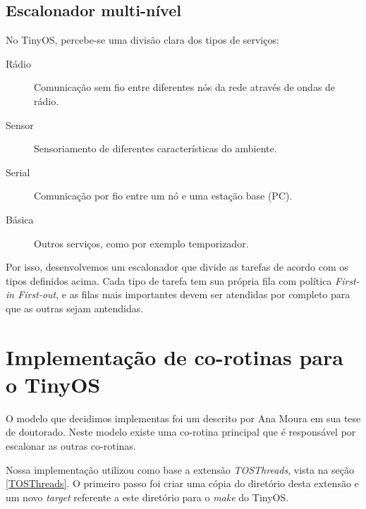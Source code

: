 \documentclass[a4paper, 10pt]{article}
\begin{document}
\subsection{Escalonador multi-nível}
No TinyOS, percebe-se uma divisão clara dos tipos de serviços: 
\begin{description}
    \item[Rádio] Comunicação sem fio entre diferentes nós da rede através de ondas de rádio.
    \item[Sensor] Sensoriamento de diferentes características do ambiente.
    \item[Serial] Comunicação por fio entre um nó e uma estação base (PC).
    \item[Básica] Outros serviços, como por exemplo temporizador.
\end{description}
Por isso, desenvolvemos um escalonador que divide as tarefas de acordo com os tipos definidos acima.
Cada tipo de tarefa tem sua própria fila com política \textit{First-in First-out}, e as filas mais importantes devem ser
atendidas por completo para que as outras sejam antendidas.


\section{Implementação de co-rotinas para o TinyOS}
O modelo que decidimos implementas foi um descrito por Ana Moura em sua tese de doutorado\cite[s. 6.2]{Moura/04}.
Neste modelo existe uma co-rotina principal que é responsável por escalonar as outras co-rotinas.

Nossa implementação utilizou como base a extensão \textit{TOSThreads}, vista na seção \ref{TOSThreads}. O primeiro passo
foi criar uma cópia do diretório desta extensão e um novo \textit{target} referente a este diretório para o \textit{make} do TinyOS.
\end{document}
